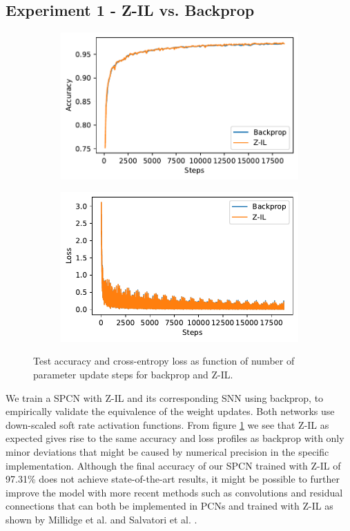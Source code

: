 \documentclass[a4paper,11pt]{article} %
\begin{document}
\subsection{Experiment 1 - Z-IL vs. Backprop}
\begin{figure}[ht]
  \begin{subfigure}[]{0.49\linewidth}
    \includegraphics[width=\linewidth]{graphics/Z-IL-backprop-accuracy.pdf}
  \end{subfigure}
  \hfill
  \begin{subfigure}[]{0.49\linewidth}
    \includegraphics[width=\linewidth]{graphics/Z-IL-backprop-loss.pdf}
  \end{subfigure}

  \caption{Test accuracy and cross-entropy loss as function of number of parameter update steps for backprop and Z-IL.}
  \label{fig:Z-IL-backprop-comparison}
\end{figure} 
We train a SPCN with Z-IL and its corresponding SNN using backprop, to empirically validate the equivalence of the weight updates. Both networks use down-scaled soft rate activation functions. From figure \ref{fig:Z-IL-backprop-comparison} we see that Z-IL as expected gives rise to the same accuracy and loss profiles as backprop with only minor deviations that might be caused by numerical precision in the specific implementation. Although the final accuracy of our SPCN trained with Z-IL of 97.31\% does not achieve state-of-the-art results, it might be possible to further improve the model with more recent methods such as convolutions and residual connections that can both be implemented in PCNs and trained with Z-IL as shown by Millidge et al. \cite{milladge2020predictive} and Salvatori et al. \cite{salvatori2021reverse}. 
\end{document}
